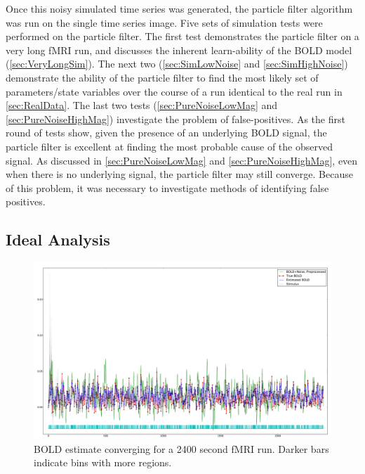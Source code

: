 Once this noisy simulated time series was generated, the particle filter algorithm
was run on the single time series image. Five sets of simulation tests
were performed on the particle filter.
The first test demonstrates the particle filter on a very long \ac{fMRI}
run, and discusses the inherent learn-ability of the \ac{BOLD} model
(\autoref{sec:VeryLongSim}).
The next two (\autoref{sec:SimLowNoise} and \autoref{sec:SimHighNoise})
demonstrate the ability of the particle filter to find the most likely
set of parameters/state variables over the course of a run identical to the
real run in \autoref{sec:RealData}. The last two
tests (\autoref{sec:PureNoiseLowMag} and \autoref{sec:PureNoiseHighMag})
investigate the problem of false-positives. As the first
round of tests show, given the presence of an underlying \ac{BOLD} signal,
the particle filter is excellent at finding the most probable cause of
the observed signal. As discussed in \autoref{sec:PureNoiseLowMag} and
\autoref{sec:PureNoiseHighMag}, even when there is no underlying signal,
the particle filter may still converge. Because of this problem, it was
necessary to investigate methods of identifying false positives.

\subsection{Ideal Analysis}
\label{sec:VeryLongSim}

\begin{figure}
\centering
\includegraphics[clip=true,trim=1cm 0cm 0cm 0cm, width=17cm]{images/long_converge}
\caption[\ac{BOLD} estimate converging for a very long \ac{fMRI} run.]{\ac{BOLD} estimate 
converging for a 2400 second \ac{fMRI} run. Darker bars indicate
bins with more regions. }
\label{fig:long_converge}
\end{figure}

